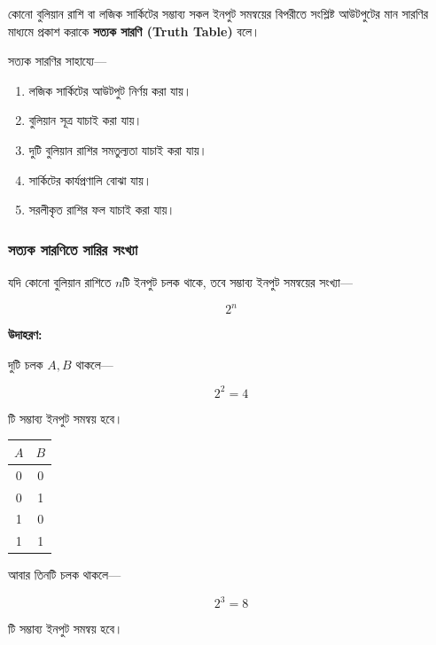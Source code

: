 কোনো বুলিয়ান রাশি বা লজিক সার্কিটের সম্ভাব্য সকল
ইনপুট সমন্বয়ের বিপরীতে সংশ্লিষ্ট আউটপুটের মান
সারণির মাধ্যমে প্রকাশ করাকে
\textbf{সত্যক সারণি
(\textenglish{Truth Table})} বলে।
\par\endgroup


সত্যক সারণির সাহায্যে—

\begin{enumerate}[leftmargin=*,itemsep=2pt]
    \item লজিক সার্কিটের আউটপুট নির্ণয় করা যায়।
    \item বুলিয়ান সূত্র যাচাই করা যায়।
    \item দুটি বুলিয়ান রাশির সমতুল্যতা যাচাই করা যায়।
    \item সার্কিটের কার্যপ্রণালি বোঝা যায়।
    \item সরলীকৃত রাশির ফল যাচাই করা যায়।
\end{enumerate}

\subsubsection*{সত্যক সারণিতে সারির সংখ্যা}

যদি কোনো বুলিয়ান রাশিতে \(n\)টি ইনপুট চলক থাকে,
তবে সম্ভাব্য ইনপুট সমন্বয়ের সংখ্যা—

\[
\boxed{2^n}
\]

\textbf{\textcolor{ICTOrange}{উদাহরণ:}}

দুটি চলক \(A,B\) থাকলে—

\[
2^2=4
\]

টি সম্ভাব্য ইনপুট সমন্বয় হবে।

\begin{center}
\begin{tabular}{|c|c|}
\hline
\rowcolor{ICTLightBlue}
\(A\) & \(B\) \\
\hline
0 & 0 \\
\hline
0 & 1 \\
\hline
1 & 0 \\
\hline
1 & 1 \\
\hline
\end{tabular}
\end{center}

আবার তিনটি চলক থাকলে—

\[
2^3=8
\]

টি সম্ভাব্য ইনপুট সমন্বয় হবে।



